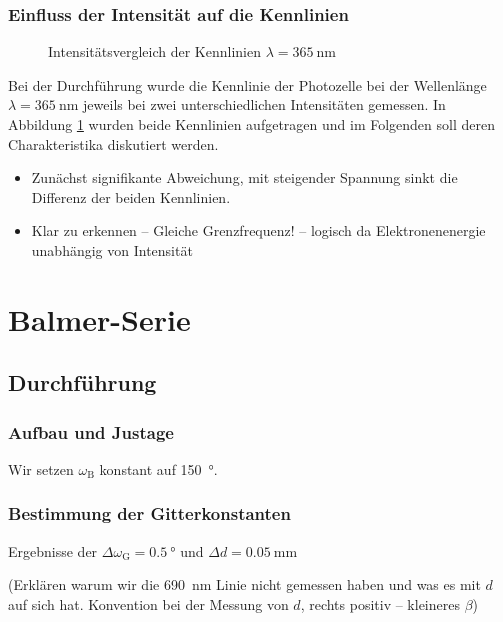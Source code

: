 \documentclass[11pt, a4paper]{article}
\numberwithin{equation}{section}
\begin{document}
\subsubsection{Einfluss der Intensität auf die Kennlinien}
\begin{figure}[h]
	\centering
	
	\caption{Intensitätsvergleich der Kennlinien $\lambda = \SI{365}{\nano\metre}$}
	\label{fig:kennlinie_intensitaet}
\end{figure}
Bei der Durchführung wurde die Kennlinie der Photozelle bei der Wellenlänge $\lambda = \SI{365}{\nano\metre}$ jeweils bei zwei unterschiedlichen Intensitäten gemessen.
In Abbildung \ref{fig:kennlinie_intensitaet} wurden beide Kennlinien aufgetragen und im Folgenden soll deren Charakteristika diskutiert werden.
\begin{itemize}
	\item Zunächst signifikante Abweichung, mit steigender Spannung sinkt die Differenz der beiden Kennlinien.
	\item Klar zu erkennen -- Gleiche Grenzfrequenz! -- logisch da Elektronenenergie unabhängig von Intensität
\end{itemize}


\section{Balmer-Serie}

\subsection{Durchführung}

\subsubsection{Aufbau und Justage}
Wir setzen $\omega_\mathrm{B}$ konstant auf \SI{150}{\degree}.

\subsubsection{Bestimmung der Gitterkonstanten}
\label{sssec:durchfuehrung_gitterkonstante}
\begin{table}[h]
	\centering
	
	\caption{Ergebnisse der $\Delta \omega_\mathrm{G} = \SI{0.5}{\degree}$ und $\Delta d = \SI{0.05}{\milli\metre}$}
	\label{tab:gitterkonstante_messdaten}
\end{table}
(Erklären warum wir die \SI{690}{\nano\metre} Linie nicht gemessen haben und was es mit $d$ auf sich hat. Konvention bei der Messung von $d$, rechts positiv -- kleineres $\beta$)
\end{document}
